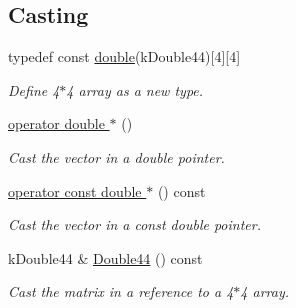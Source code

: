 \subsection*{Casting}
\begin{DoxyCompactItemize}
\item 
typedef const \hyperlink{class_fbx_matrix_a01f8be57393e5d9973b23897c29d5520}{double}(k\+Double44)\mbox{[}4\mbox{]}\mbox{[}4\mbox{]}
\begin{DoxyCompactList}\small\item\em Define 4$\ast$4 array as a new type. \end{DoxyCompactList}\item 
\hyperlink{class_fbx_matrix_aef325dea7b08df3c2703e05403a431e8}{operator double $\ast$} ()
\begin{DoxyCompactList}\small\item\em Cast the vector in a double pointer. \end{DoxyCompactList}\item 
\hyperlink{class_fbx_matrix_affabd5f07e4286c8da7faedee32c054f}{operator const double $\ast$} () const
\begin{DoxyCompactList}\small\item\em Cast the vector in a const double pointer. \end{DoxyCompactList}\item 
k\+Double44 \& \hyperlink{class_fbx_matrix_a0bb3a6188a337f2ae4e92bef4d2a0a3a}{Double44} () const
\begin{DoxyCompactList}\small\item\em Cast the matrix in a reference to a 4$\ast$4 array. \end{DoxyCompactList}\end{DoxyCompactItemize}

